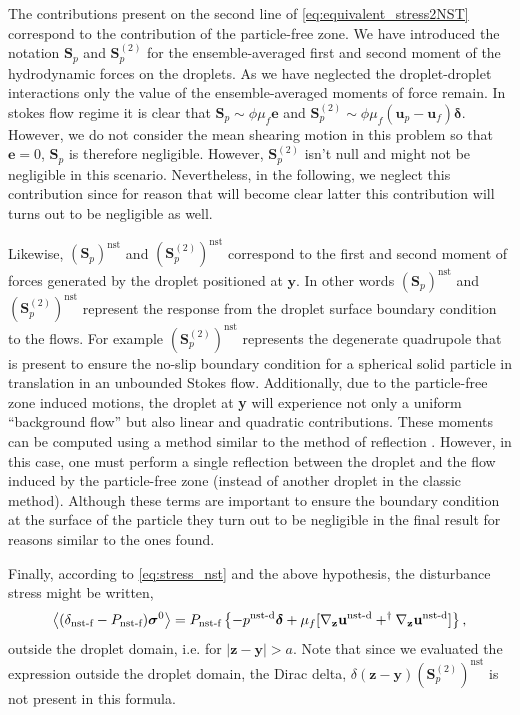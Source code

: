The contributions present on the second line of \ref{eq:equivalent_stress2NST} correspond to the contribution of the particle-free zone. 
We have introduced the notation $\textbf{S}_p$ and $\textbf{S}_p^{(2)}$ for the ensemble-averaged first and second moment of the hydrodynamic forces on the droplets. 
As we have neglected the droplet-droplet interactions only the value of the ensemble-averaged moments of force remain. 
In stokes flow regime it is clear that $\textbf{S}_p \sim  \phi \mu_f \textbf{e}$ and $\textbf{S}_p^{(2)} \sim  \phi \mu_f (\textbf{u}_p - \textbf{u}_f)\bm\delta$.
However, we do not consider the mean shearing motion in this problem so that $\textbf{e}=0$, $\textbf{S}_p$ is therefore negligible. 
However, $\textbf{S}_p^{(2)}$ isn't null and might not be negligible in this scenario. 
Nevertheless, in the following, we neglect this contribution since for reason that will become clear latter this contribution will turns out to be negligible as well.  

Likewise, $(\textbf{S}_p)^\text{nst}$ and $(\textbf{S}_p^{(2)})^\text{nst}$ correspond to the first and second moment of forces generated by the droplet positioned at $\textbf{y}$. 
In other words $(\textbf{S}_p)^\text{nst}$ and $(\textbf{S}_p^{(2)})^\text{nst}$ represent the response from the droplet surface boundary condition to the flows. 
For example $(\textbf{S}_p^{(2)})^\text{nst}$ represents the degenerate quadrupole that is present to ensure the no-slip boundary condition for a spherical solid particle in translation in an unbounded Stokes flow. 
Additionally, due to the particle-free zone induced motions, the droplet at \textbf{y} will experience not only a uniform ``background flow'' but also linear and quadratic contributions. 
These moments can be computed using a method similar to the method of reflection \citep{kim2013microhydrodynamics}. 
However, in this case, one must perform a single reflection between the droplet and the flow induced by the particle-free zone (instead of another droplet in the classic method). 
Although these terms are important to ensure the boundary condition at the surface of the particle they turn out to be negligible in the final result for reasons similar to the ones \citet{zhang2021ensemble} found. 



Finally, according to \ref{eq:stress_nst} and the above hypothesis, the disturbance stress might be written, 
\begin{equation}
    \left<(\delta_\text{nst-f} - P_\text{nst-f}) \bm\sigma^0\right>
    =
    P_\text{nst-f}\left\{
        -p^\text{nst-d}\bm\delta 
        + \mu_f [{\mathbf{\nabla}_\textbf{z}} \textbf{u}^\text{nst-d}+^\dagger{\mathbf{\nabla}_\textbf{z}} \textbf{u}^\text{nst-d}]
    \right\},
\end{equation}
outside the droplet domain, i.e. for $|\textbf{z} - \textbf{y}| > a$. 
Note that since we evaluated the expression outside the droplet domain, the Dirac delta, $\delta(\textbf{z}-\textbf{y})(\textbf{S}_p^{(2)})^\text{nst}$ is not present in this formula. 

